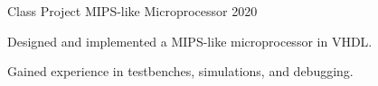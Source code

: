 \begin{cventries}

  \cventry
    {Class Project} %
    {MIPS-like Microprocessor} %
    {} %
    {2020} %
    {
      \begin{cvitems} %
        \item {Designed and implemented a MIPS-like microprocessor in VHDL.}
        \item {Gained experience in testbenches, simulations, and debugging.}
      \end{cvitems}
    }


\end{cventries}